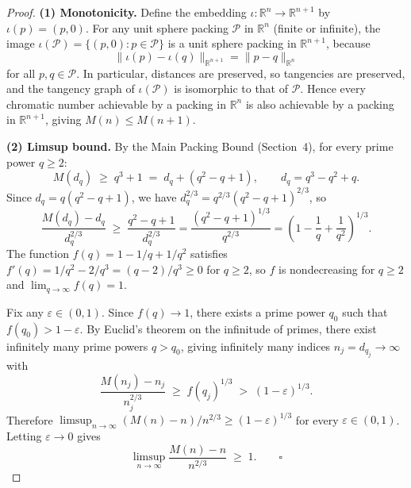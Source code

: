 \begin{proof}
\textbf{(1) Monotonicity.}
Define the embedding $\iota:\mathbb{R}^n\to\mathbb{R}^{n+1}$ by $\iota(p)=(p,0)$.  For any unit sphere packing $\mathcal{P}$ in $\mathbb{R}^n$ (finite or infinite), the image $\iota(\mathcal{P})=\{(p,0):p\in\mathcal{P}\}$ is a unit sphere packing in $\mathbb{R}^{n+1}$, because
\[
\|\iota(p)-\iota(q)\|_{\mathbb{R}^{n+1}}=\|p-q\|_{\mathbb{R}^n}
\]
for all $p,q\in\mathcal{P}$.  In particular, distances are preserved, so tangencies are preserved, and the tangency graph of $\iota(\mathcal{P})$ is isomorphic to that of $\mathcal{P}$.  Hence every chromatic number achievable by a packing in $\mathbb{R}^n$ is also achievable by a packing in $\mathbb{R}^{n+1}$, giving $M(n)\le M(n+1)$.

\textbf{(2) Limsup bound.}
By the Main Packing Bound (Section~4), for every prime power $q\ge 2$:
\[
M(d_q)\;\ge\; q^3+1 \;=\; d_q + (q^2-q+1),\qquad d_q=q^3-q^2+q.
\]
Since $d_q=q(q^2-q+1)$, we have $d_q^{2/3}=q^{2/3}(q^2-q+1)^{2/3}$, so
\[
\frac{M(d_q)-d_q}{d_q^{2/3}}\;\ge\;\frac{q^2-q+1}{d_q^{2/3}}=\frac{(q^2-q+1)^{1/3}}{q^{2/3}}=\left(1-\frac{1}{q}+\frac{1}{q^2}\right)^{1/3}.
\]
The function $f(q)=1-1/q+1/q^2$ satisfies $f'(q)=1/q^2-2/q^3=(q-2)/q^3\ge 0$ for $q\ge 2$, so $f$ is nondecreasing for $q\ge 2$ and $\lim_{q\to\infty}f(q)=1$.

Fix any $\varepsilon\in(0,1)$.  Since $f(q)\to 1$, there exists a prime power $q_0$ such that $f(q_0)>1-\varepsilon$.  By Euclid's theorem on the infinitude of primes, there exist infinitely many prime powers $q>q_0$, giving infinitely many indices $n_j=d_{q_j}\to\infty$ with
\[
\frac{M(n_j)-n_j}{n_j^{2/3}}\;\ge\;f(q_j)^{1/3}\;>\;(1-\varepsilon)^{1/3}.
\]
Therefore $\limsup_{n\to\infty}(M(n)-n)/n^{2/3}\ge (1-\varepsilon)^{1/3}$ for every $\varepsilon\in(0,1)$.  Letting $\varepsilon\to 0$ gives
\[
\limsup_{n\to\infty}\frac{M(n)-n}{n^{2/3}}\;\ge\;1.\qquad\square
\]
\end{proof}
